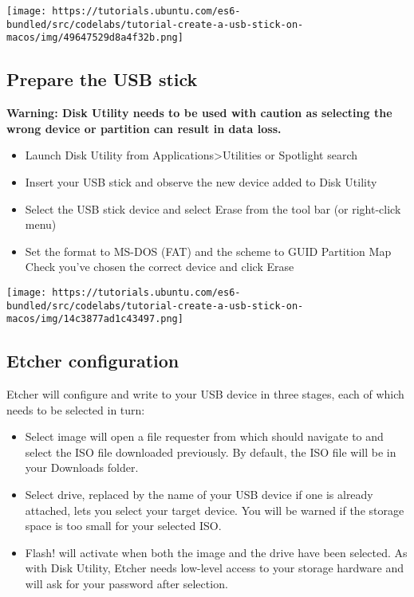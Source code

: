 \texttt{[image: https://tutorials.ubuntu.com/es6-bundled/src/codelabs/tutorial-create-a-usb-stick-on-macos/img/49647529d8a4f32b.png]}

\subsection{Prepare the USB stick}

\textbf{Warning: Disk Utility needs to be used with caution as selecting
the wrong device or partition can result in data loss.}

\begin{itemize}
\item
  Launch Disk Utility from Applications\textgreater{}Utilities or
  Spotlight search
\item
  Insert your USB stick and observe the new device added to Disk Utility
\item
  Select the USB stick device and select Erase from the tool bar (or
  right-click menu)
\item
  Set the format to MS-DOS (FAT) and the scheme to GUID Partition Map
  Check you've chosen the correct device and click Erase
\end{itemize}

\texttt{[image: https://tutorials.ubuntu.com/es6-bundled/src/codelabs/tutorial-create-a-usb-stick-on-macos/img/14c3877ad1c43497.png]}

\subsection{Etcher configuration}

Etcher will configure and write to your USB device in three stages, each
of which needs to be selected in turn:

\begin{itemize}
\item
  Select image will open a file requester from which should navigate to
  and select the ISO file downloaded previously. By default, the ISO
  file will be in your Downloads folder.
\item
  Select drive, replaced by the name of your USB device if one is
  already attached, lets you select your target device. You will be
  warned if the storage space is too small for your selected ISO.
\item
  Flash! will activate when both the image and the drive have been
  selected. As with Disk Utility, Etcher needs low-level access to your
  storage hardware and will ask for your password after selection.
\end{itemize}

